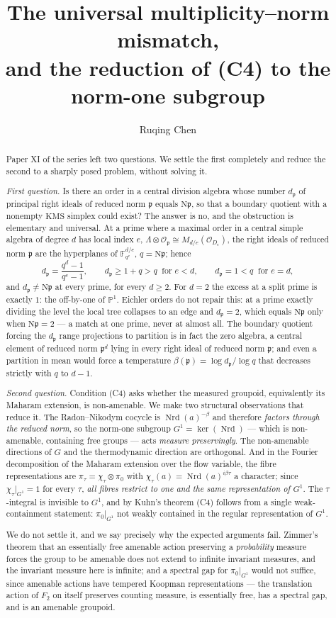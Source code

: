 \documentclass[11pt]{amsart}
\title[Multiplicity--norm mismatch and the reduction of (C4)]{The universal multiplicity--norm mismatch,\\ and the reduction of \textup{(C4)} to the norm-one subgroup}
\author{Ruqing Chen}
\date{}
\numberwithin{equation}{section}
\theoremstyle{definition}
\theoremstyle{remark}
\newcommand{\F}{\mathbb{F}}
\newcommand{\cO}{\mathcal{O}}
\newcommand{\pp}{\mathfrak{p}}
\newcommand{\Ns}{\mathrm{N}}
\newcommand{\Nrd}{\operatorname{Nrd}}
\begin{document}
\begin{abstract}
Paper XI of the series left two questions. We settle the first completely and reduce the
second to a sharply posed problem, without solving it.

\emph{First question.} Is there an order in a central division algebra whose number
$d_\pp$ of principal right ideals of reduced norm $\pp$ equals $\Ns\pp$, so that a boundary
quotient with a nonempty $\mathrm{KMS}$ simplex could exist? The answer is no, and the
obstruction is elementary and universal. At a prime where a maximal order in a central
simple algebra of degree $d$ has local index $e$, $\Lambda\otimes\cO_\pp\cong M_{d/e}(\cO_{D_e})$,
the right ideals of reduced norm $\pp$ are the hyperplanes of $\F_{q^e}^{d/e}$, $q=\Ns\pp$;
hence
\[
d_\pp=\frac{q^d-1}{q^e-1},\qquad d_\pp\ge1+q>q\ \text{ for }e<d,\qquad d_\pp=1<q\ \text{ for }e=d,
\]
and $d_\pp\ne\Ns\pp$ at every prime, for every $d\ge2$. For $d=2$ the excess at a split prime
is exactly $1$: the off-by-one of $\mathbb P^1$. Eichler orders do not repair this: at a
prime exactly dividing the level the local tree collapses to an edge and $d_\pp=2$, which
equals $\Ns\pp$ only when $\Ns\pp=2$ --- a match at one prime, never at almost all. The
boundary quotient forcing the $d_\pp$ range projections to partition is in fact the zero
algebra, a central element of reduced norm $\pp^d$ lying in every right ideal of reduced norm
$\pp$; and even a partition in mean would force a temperature
$\beta(\pp)=\log d_\pp/\log q$ that decreases strictly with $q$ to $d-1$.

\emph{Second question.} Condition (C4) asks whether the measured groupoid, equivalently its
Maharam extension, is non-amenable. We make two structural observations that reduce it.
The Radon--Nikodym cocycle is $\Nrd(a)^{-\beta}$ and therefore \emph{factors through the
reduced norm}, so the norm-one subgroup $G^1=\ker(\Nrd)$ --- which is non-amenable,
containing free groups --- acts \emph{measure preservingly}. The non-amenable directions of
$G$ and the thermodynamic direction are orthogonal. And in the Fourier decomposition of the
Maharam extension over the flow variable, the fibre representations are
$\pi_\tau=\chi_\tau\otimes\pi_0$ with $\chi_\tau(a)=\Nrd(a)^{i\beta\tau}$ a character; since
$\chi_\tau|_{G^1}=1$ for every $\tau$, \emph{all fibres restrict to one and the same
representation of $G^1$}. The $\tau$-integral is invisible to $G^1$, and by Kuhn's theorem
(C4) follows from a single weak-containment statement: $\pi_0|_{G^1}$ not weakly contained in
the regular representation of $G^1$.

We do not settle it, and we say precisely why the expected arguments fail. Zimmer's theorem
that an essentially free amenable action preserving a \emph{probability} measure forces the
group to be amenable does not extend to infinite invariant measures, and the invariant
measure here is infinite; and a spectral gap for $\pi_0|_{G^1}$ would not suffice, since
amenable actions have tempered Koopman representations --- the translation action of $F_2$
on itself preserves counting measure, is essentially free, has a spectral gap, and is an
amenable groupoid.
\end{abstract}
\end{document}
